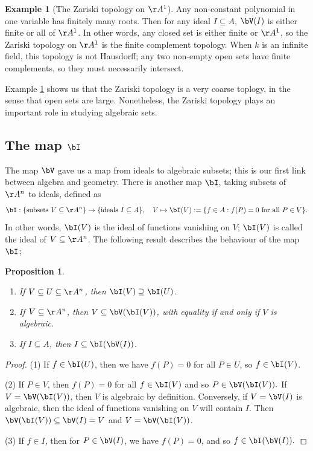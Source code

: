 \documentclass[12pt]{amsart}
\theoremstyle{plain}
\newtheorem{proposition}[theorem]{Proposition}
\theoremstyle{definition}
\newtheorem{example}[theorem]{Example}
\begin{document}
\begin{example}[The Zariski topology on $\AA^1$]\label{zariskia1}
Any non-constant polynomial in one variable has finitely many roots.
Then for any ideal $I \subseteq A$, $\bV(I)$ is either finite or all of $\AA^1$.
In other words, any closed set is either finite or $\AA^1$, so the Zariski topology on $\AA^1$ is the finite complement topology.
When $k$ is an infinite field, this topology is not Hausdorff; any two non-empty open sets have finite complements, so they must necessarily intersect.
\end{example}

Example \ref{zariskia1} shows us that the Zariski topology is a very coarse toplogy, in the sense that open sets are large.
Nonetheless, the Zariski topology plays an important role in studying algebraic sets.





\subsection{The map $\bI$}
The map $\bV$ gave us a map from ideals to algebraic subsets; this is our first link between algebra and geometry.
There is another map $\bI$, taking subsets of $\AA^n$ to ideals, defined as
$$\bI: \{\text{subsets } V \subseteq \AA^n\} \to \{\text{ideals } I \subseteq A\}, \quad V\mapsto \bI(V) := \{f \in A : f(P) = 0 \text{ for all } P \in V\}.$$
In other words, $\bI(V)$ is the ideal of functions vanishing on $V$; $\bI(V)$ is called the ideal of $V \subseteq \AA^n$.
The following result describes the behaviour of the map $\bI$;

\begin{proposition}\label{iproperties}
\begin{enumerate}
\item If $V \subseteq U \subseteq \AA^n$, then $\bI(V) \supseteq \bI(U)$.
\item If $V \subseteq \AA^n$, then $V \subseteq \bV(\bI(V))$, with equality if and only if $V$ is algebraic.
\item If $I \subseteq A$, then $I \subseteq \bI(\bV(I))$.
\end{enumerate}
\end{proposition}
\begin{proof}
(1) If $f \in \bI(U)$, then we have $f(P) = 0$ for all $P \in U$, so $f \in \bI(V)$.

(2) If $P \in V$, then $f(P) = 0$ for all $f \in \bI(V)$ and so $P \in \bV(\bI(V)).$
If $V = \bV(\bI(V))$, then $V$ is algebraic by definition.
Conversely, if $V = \bV(I)$ is algebraic, then the ideal of functions vanishing on $V$ will contain $I$.
Then $\bV(\bI(V)) \subseteq \bV(I) = V$ and $V = \bV(\bI(V))$.

(3) If $f \in I$, then for $P \in \bV(I)$, we have $f(P) = 0$, and so $f \in \bI(\bV(I)).$
\end{proof}
\end{document}
